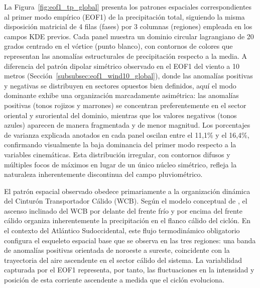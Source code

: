 La Figura~\ref{fig:eof1_tp_global} presenta los patrones espaciales correspondientes al primer modo empírico (EOF1) de la precipitación total, siguiendo la misma disposición matricial de 4 filas (fases) por 3 columnas (regiones) empleada en los campos KDE previos. Cada panel muestra un dominio circular lagrangiano de 20 grados centrado en el vórtice (punto blanco), con contornos de colores que representan las anomalías estructurales de precipitación respecto a la media. A diferencia del patrón dipolar simétrico observado en el EOF1 del viento a 10 metros (Sección~\ref{subsubsec:eof1_wind10_global}), donde las anomalías positivas y negativas se distribuyen en sectores opuestos bien definidos, aquí el modo dominante exhibe una organización marcadamente asimétrica: las anomalías positivas (tonos rojizos y marrones) se concentran preferentemente en el sector oriental y suroriental del dominio, mientras que los valores negativos (tonos azules) aparecen de manera fragmentada y de menor magnitud. Los porcentajes de varianza explicada anotados en cada panel oscilan entre el 11,1\% y el 16,4\%, confirmando visualmente la baja dominancia del primer modo respecto a la variables cinemáticas. Esta distribución irregular, con contornos difusos y múltiples focos de máximos en lugar de un único núcleo simétrico, refleja la naturaleza inherentemente discontinua del campo pluviométrico.

El patrón espacial observado obedece primariamente a la organización dinámica del Cinturón Transportador Cálido (WCB). Según el modelo conceptual de \citet{browning1986conceptual}, el ascenso inclinado del WCB por delante del frente frío y por encima del frente cálido organiza inherentemente la precipitación en el flanco cálido del ciclón. En el contexto del Atlántico Sudoccidental, este flujo termodinámico obligatorio configura el esqueleto espacial base que se observa en las tres regiones: una banda de anomalías positivas orientada de noroeste a sureste, coincidente con la trayectoria del aire ascendente en el sector cálido del sistema. La variabilidad capturada por el EOF1 representa, por tanto, las fluctuaciones en la intensidad y posición de esta corriente ascendente a medida que el ciclón evoluciona.

